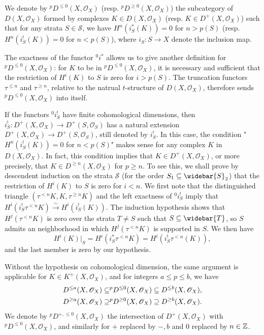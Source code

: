 \begin{definition}
We denote by ${^pD^{\leq 0}}(X,\mathscr{O}_X)$ (resp. ${^pD^{\geq 0}}(X,\mathscr{O}_X)$) the subcategory of $D(X,\mathscr{O}_X)$ formed by complexes $K\in D(X,\mathscr{O}_X)$ (resp. $K\in D^+(X,\mathscr{O}_X)$) such that for any strata $S\in\mathcal{S}$, we have $H^n(i_S^*(K))=0$ for $n>p(S)$ (resp. $H^n(i_S^!(K))=0$ for $n<p(S)$), where $i_S:S\to X$ denote the inclusion map.
\end{definition}

The exactness of the functor ${^0i^*}$ allows us to give another definition for ${^pD^{\leq 0}(X,\mathscr{O}_X)}$: for $K$ to be in ${^pD^{\leq 0}}(X,\mathscr{O}_X)$, it is necessary and sufficient that the restriction of $H^i(K)$ to $S$ is zero for $i>p(S)$. The truncation functors $\tau^{\leq n}$ and $\tau^{\geq n}$, relative to the natrual $t$-structure of $D(X,\mathscr{O}_X)$, therefore sends ${^pD^{\leq 0}}(X,\mathscr{O}_X)$ into itself.

\begin{remark}\label{triangle cat perverse condition finite cohomology dim}
If the functors ${^0i_S^!}$ have finite cohomological dimensions, then $i_S^!:D^+(X,\mathscr{O}_X)\to D^+(S,\mathscr{O}_S)$ has a natural extension $D^+(X,\mathscr{O}_X)\to D^+(S,\mathscr{O}_S)$, still denoted by $i_S^!$. In this case, the condition "$H^n(i_S^!(K))=0$ for $n<p(S)$" makes sense for any complex $K$ in $D(X,\mathscr{O}_X)$. In fact, this condition implies that $K\in D^+(X,\mathscr{O}_X)$, or more precisely, that $K\in D^{\geq n}(X,\mathscr{O}_X)$ for $p\geq n$. To see this, we shall prove by descendent induction on the strata $\mathcal{S}$ (for the order $S_1\sub\widebar{S}_2$) that the restriction of $H^i(K)$ to $S$ is zero for $i<n$. We first note that the distinguished triangle $(\tau^{<n}K,K,\tau^{\geq n}K)$ and the left exactness of ${^0i_S^!}$ imply that $H^i(i_S^!\tau^{<n}K)\stackrel{\sim}{\to} H^i(i_S^!(K))$. The induction hypothesis shows that $H^j(\tau^{<n}K)$ is zero over the strata $T\neq S$ such that $S\sub\widebar{T}$, so $S$ admits an neighborhood in which $H^j(\tau^{<n}K)$ is supported in $S$. We then have
\[H^i(K)|_S=H^i(i_S^*\tau^{<n}K)=H^i(i_S^!\tau^{<n}(K)),\]
and the last member is zero by our hypothesis.\par
Without the hypothesis on cohomological dimension, the same argument is applicable for $K\in K^+(X,\mathscr{O}_X)$, and for integers $a\leq p\leq b$, we have
\begin{align}
D^{\leq a}(X,\mathscr{O}_X)\subseteq &{^pD^{\leq 0}}(X,\mathscr{O}_X)\subseteq D^{\leq b}(X,\mathscr{O}_X),\label{triangle cat perverse condition inclusion-1}\\
D^{\geq a}(X,\mathscr{O}_X)\supseteq &{^pD^{\geq 0}}(X,\mathscr{O}_X)\supseteq D^{\geq b}(X,\mathscr{O}_X).\label{triangle cat perverse condition inclusion-2}
\end{align}
We denote by ${^pD^{+,\leq 0}}(X,\mathscr{O}_X)$ the intersection of $D^+(X,\mathscr{O}_X)$ with ${^pD^{\leq 0}}(X,\mathscr{O}_X)$, and similarly for $+$ replaced by $-,b$ and $0$ replaced by $n\in\mathbb{Z}$.
\end{remark}



